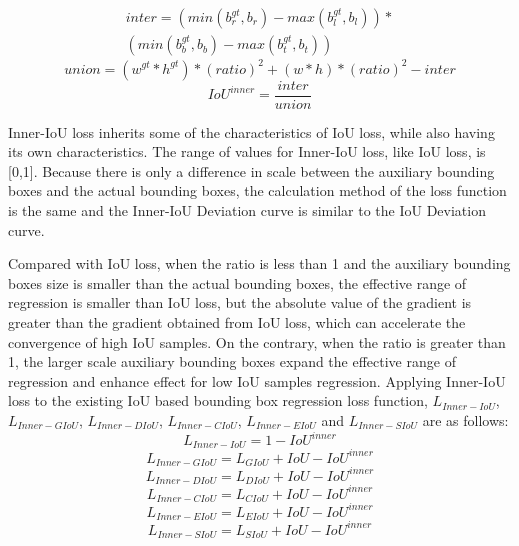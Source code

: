 \documentclass[lettersize,journal]{IEEEtran}
\begin{document}
	\begin{equation}
	\begin{aligned}
			inter=(min(b_{r}^{gt},b_{r})-max(b_{l}^{gt},b_{l}))*\\
			(min(b_{b}^{gt},b_{b})-max(b_{t}^{gt},b_{t}))
	\end{aligned}
	\end{equation}
	\begin{equation}
		union=(w^{gt}*h^{gt})*(ratio)^{2}+(w*h)*(ratio)^{2}-inter
	\end{equation}
	\begin{equation}
		IoU^{inner}=\frac{inter}{union}
	\end{equation}
	\par Inner-IoU loss inherits some of the characteristics of IoU loss, while also having its own characteristics. The range of values for Inner-IoU loss, like IoU loss, is [0,1]. Because there is only a difference in scale between the auxiliary bounding boxes and the actual bounding boxes, the calculation method of the loss function is the same and the Inner-IoU Deviation curve is similar to the IoU Deviation curve.
	\par Compared with IoU loss, when the ratio is less than 1 and the auxiliary bounding boxes size is smaller than the actual bounding boxes, the effective range of regression is smaller than IoU loss, but the absolute value of the gradient is greater than the gradient obtained from IoU loss, which can accelerate the convergence of high IoU samples. On the contrary, when the ratio is greater than 1, the larger scale auxiliary bounding boxes expand the effective range of regression and enhance effect for low IoU samples regression. Applying Inner-IoU loss to the existing IoU based bounding box regression loss function, $L_{Inner-IoU}$, $L_{Inner-GIoU}$, $L_{Inner-DIoU}$, $L_{Inner-CIoU}$, $L_{Inner-EIoU}$ and $L_{Inner-SIoU}$ are as follows:
	\begin{equation}
		L_{Inner-IoU}=1-IoU^{inner}
	\end{equation}
	\begin{equation}
		L_{Inner-GIoU}=L_{GIoU}+IoU-IoU^{inner}
	\end{equation}
	\begin{equation}
		L_{Inner-DIoU}=L_{DIoU}+IoU-IoU^{inner}
	\end{equation}
	\begin{equation}
		L_{Inner-CIoU}=L_{CIoU}+IoU-IoU^{inner}
	\end{equation}
	\begin{equation}
		L_{Inner-EIoU}=L_{EIoU}+IoU-IoU^{inner}
	\end{equation}
	\begin{equation}
		L_{Inner-SIoU}=L_{SIoU}+IoU-IoU^{inner}
	\end{equation}
\end{document}
